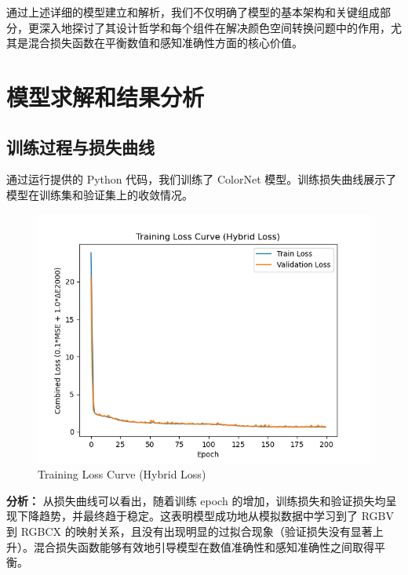 通过上述详细的模型建立和解析，我们不仅明确了模型的基本架构和关键组成部分，更深入地探讨了其设计哲学和每个组件在解决颜色空间转换问题中的作用，尤其是混合损失函数在平衡数值和感知准确性方面的核心价值。

\section[\hspace{-2pt}模型求解和结果分析]{{\heiti{} \hspace{-8pt}模型求解和结果分析}}\label{section2: 模型求解和结果分析}

\subsection[\hspace{-2pt}训练过程与损失曲线]{{\heiti{} \hspace{-8pt}训练过程与损失曲线}}\label{section2: 训练过程与损失曲线}

通过运行提供的 Python 代码，我们训练了 ColorNet 模型。训练损失曲线展示了模型在训练集和验证集上的收敛情况。



\begin{figure}[h!]
\centering
{}
\includegraphics[width=0.8\columnwidth]{figures/Training_Loss_Curve.png} %
\caption[Training Loss Curve (Hybrid Loss)]{Training Loss Curve (Hybrid Loss)}
\label{figure2: loss_curve}
\end{figure}

\textbf{分析：}
从损失曲线可以看出，随着训练 epoch 的增加，训练损失和验证损失均呈现下降趋势，并最终趋于稳定。这表明模型成功地从模拟数据中学习到了 RGBV 到 RGBCX 的映射关系，且没有出现明显的过拟合现象（验证损失没有显著上升）。混合损失函数能够有效地引导模型在数值准确性和感知准确性之间取得平衡。

